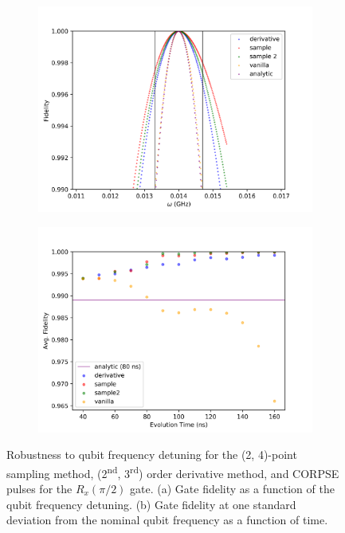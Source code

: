 \documentclass[
  amsfonts,
  amsmath,
  tbtags,
  amssymb,
  aps,
  nobibnotes,
  twocolumn,
]{revtex4-2}
\begin{document}
\begin{figure}
  \begin{subfigure}{\linewidth}
    \label{fig:5.1:a}
    \includegraphics[width=\linewidth]{assets/00005_spin12_hpsweep.png}
  \end{subfigure}
  
  \begin{subfigure}{\linewidth}
    \includegraphics[width=\linewidth]{assets/00006_spin12_hpsweep.png}
    \label{fig:5.1:b}
  \end{subfigure}
  \caption{\centering Robustness to qubit frequency detuning for
    the (2, 4)-point sampling method, (2\textsuperscript{nd}, 3\textsuperscript{rd})
    order derivative method, and CORPSE pulses for the $R_{x}(\pi/2)$ gate.
    (a) Gate fidelity as a function of the qubit frequency detuning.
    (b) Gate fidelity at one standard deviation from the nominal qubit frequency
    as a function of time.
  }
\end{figure}
\end{document}
